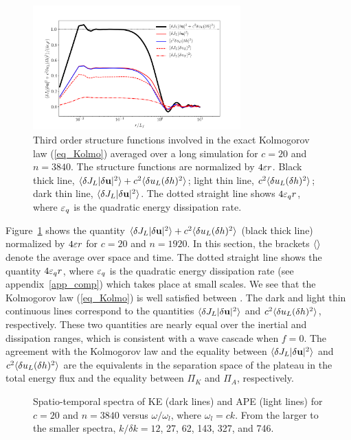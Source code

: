\begin{figure}
\centerline{\includegraphics[width=8cm]{../Pyfig/fig_Kolmo_c=20_N=3840}}
\caption{
Third order structure functions involved in the exact Kolmogorov law (\ref{eq_Kolmo}) 
averaged over a long simulation for $c = 20$ and $n = 3840$.
%
The structure functions are normalized by $4 \varepsilon r$.
%
Black thick line, $\langle  \delta J_L|\delta \textbf{u}|^2  \rangle 
+ c^2\langle \delta u_L(\delta h)^2 \rangle$;
light thin line, $c^2\langle \delta u_L (\delta h)^2 \rangle$;
dark thin line, $\langle \delta J_L |\delta \textbf{u}|^2 \rangle$.
%
The dotted straight line shows $4 \varepsilon_q r$, 
where $\varepsilon_q$ is the quadratic energy dissipation rate.
}
\label{fig_Kolmo}
\end{figure}


Figure~\ref{fig_Kolmo} shows the quantity $\langle \delta J_L|\delta
\textbf{u}|^2  \rangle + c^2\langle \delta u_L(\delta h)^2  \rangle$ (black thick line)
normalized by $4 \varepsilon r$ for $c = 20$ and $n = 1920$.
%
In this section, the brackets $\langle  \rangle$ denote the average over space
and time.
%
The dotted straight line shows the quantity $4 \varepsilon_q r$, where
$\varepsilon_q$ is the quadratic energy dissipation rate (see
appendix~\ref{app_comp}) which takes place at small scales.
%
We see that the Kolmogorov law (\ref{eq_Kolmo}) is well satisfied
between .  The dark and
light thin continuous lines correspond to the quantities $\langle \delta
J_L|\delta \textbf{u}|^2  \rangle$ and $c^2\langle \delta u_L(\delta h)^2 \rangle$,
respectively.
%
These two quantities are nearly equal over the inertial and
dissipation ranges, which is consistent with a wave cascade when
$f=0$.
%
The agreement with the Kolmogorov law and the equality between
$\langle \delta J_L|\delta \textbf{u}|^2  \rangle$ and $c^2\langle \delta u_L(\delta
h)^2 \rangle$ are the equivalents in the separation space of the plateau in
the total energy flux and the equality between $\Pi_K$ and $\Pi_A$,
respectively.




\begin{figure}
\caption{Spatio-temporal spectra of KE (dark lines) and APE (light
lines) for $c = 20$ and $n = 3840$ versus $\omega/\omega_l$, where
$\omega_l = c k$.  From the larger to the smaller spectra, $k/\delta k
= 12$, 27, 62, 143, 327, and 746.  }
\label{fig_spatiotemp_spectra}
\end{figure}

